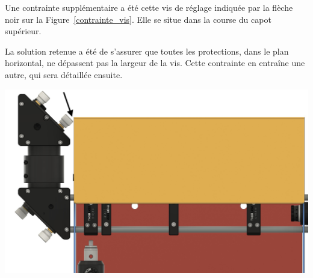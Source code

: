 \begin{minipage}[c]{0.4\textwidth}
    Une contrainte supplémentaire a été cette vis de réglage indiquée par la flèche noir sur la Figure~\ref{contrainte_vis}. Elle se situe dans la course du capot supérieur.

    La solution retenue a été de s'assurer que toutes les protections, dans le plan horizontal, ne dépassent pas la largeur de la vis. Cette contrainte en entraîne une autre, qui sera détaillée ensuite.
\end{minipage}\hfill
\begin{minipage}[c]{0.58\textwidth}
    \begin{center}
        \includegraphics[width=\textwidth]{assets/figures/Protections_laser/Securite_mecanique/Protection_entree_laser/contrainte_vis.jpeg}
    \end{center}
    \label{contrainte_vis}
\end{minipage}

